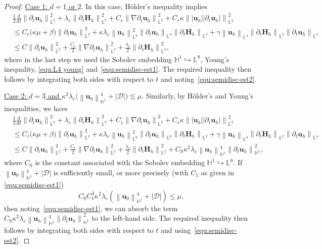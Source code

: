 \documentclass[11pt, reqno]{amsart}
\theoremstyle{definition}
\theoremstyle{remark}
\numberwithin{equation}{section}
\newcommand{\bff}{\boldsymbol}
\newcommand{\bb}{\mathbb}
\newcommand{\ddt}{\frac{\mathrm{d}}{\mathrm{d}t}}
\newcommand{\norm}[2]{\left\|{#1}\right\|_{#2}}
\begin{document}
\begin{proof}
\medskip
\noindent
\underline{Case 1: $d=1$ or $2$}. In this case, H\"{o}lder's inequality implies
\begin{align*}
	&\frac{1}{2} \ddt \norm{\partial_t \bff{u}_h}{\bb{L}^2}^2
	+
	\lambda_e \norm{\partial_t \bff{H}_h}{\bb{L}^2}^2
	+
	C_r \norm{\nabla \partial_t \bff{u}_h}{\bb{L}^2}^2
	+
	C_r\kappa \norm{|\bff{u}_h| |\partial_t \bff{u}_h|}{\bb{L}^2}^2
	\\
	&\leq
	C_r \big(\kappa\mu+\beta\big) \norm{\partial_t \bff{u}_h}{\bb{L}^2}^2
	+
	\kappa \lambda_e \norm{\bff{u}_h}{\bb{L}^8}^2
	\norm{\partial_t \bff{u}_h}{\bb{L}^4}
	\norm{\partial_t \bff{H}_h}{\bb{L}^2}
	+
	\gamma \norm{\bff{u}_h}{\bb{L}^4}
	\norm{\partial_t \bff{H}_h}{\bb{L}^2}
	\norm{\partial_t \bff{u}_h}{\bb{L}^4}
	\\
	&\leq
	C \norm{\partial_t \bff{u}_h}{\bb{L}^2}^2
	+
	\frac{C_r}{2} \norm{\nabla \partial_t \bff{u}_h}{\bb{L}^2}^2
	+
	\frac{\lambda_e}{2} \norm{\partial_t \bff{H}_h}{\bb{L}^2}^2,
\end{align*}
where in the last step we used the Sobolev embedding $\bb{H}^1 \hookrightarrow \bb{L}^8$, Young's inequality, \eqref{equ:L4 young} and~\eqref{equ:semidisc-est1}. The required inequality then follows by integrating both sides with respect to $t$ and noting~\eqref{equ:semidisc-est2}.

\medskip
\noindent
\underline{Case 2: $d=3$ and $\kappa^2 \lambda_e \big(\norm{\bff{u}_0}{\bb{H}^1}^4 + |\mathscr{D}|\big)\lesssim \mu$}. Similarly, by H\"{o}lder's and Young's inequalities, we have
\begin{align*}
	&\frac{1}{2} \ddt \norm{\partial_t \bff{u}_h}{\bb{L}^2}^2
	+
	\lambda_e \norm{\partial_t \bff{H}_h}{\bb{L}^2}^2
	+
	C_r \norm{\nabla \partial_t \bff{u}_h}{\bb{L}^2}^2
	+
	C_r\kappa \norm{|\bff{u}_h| |\partial_t \bff{u}_h|}{\bb{L}^2}^2
	\\
	&\leq
	C_r \big(\kappa\mu+\beta\big) \norm{\partial_t \bff{u}_h}{\bb{L}^2}^2
	+
	\kappa \lambda_e \norm{\bff{u}_h}{\bb{L}^6}^2
	\norm{\partial_t \bff{u}_h}{\bb{L}^6}
	\norm{\partial_t \bff{H}_h}{\bb{L}^2}
	+
	\gamma \norm{\bff{u}_h}{\bb{L}^4}
	\norm{\partial_t \bff{H}_h}{\bb{L}^2}
	\norm{\partial_t \bff{u}_h}{\bb{L}^4}
	\\
	&\leq
	C \norm{\partial_t \bff{u}_h}{\bb{L}^2}^2
	+
	\frac{C_r}{2} \norm{\nabla \partial_t \bff{u}_h}{\bb{L}^2}^2
	+
	\frac{\lambda_e}{2} \norm{\partial_t \bff{H}_h}{\bb{L}^2}^2
	+
	C_{\mathrm{S}} \kappa^2 \lambda_e \norm{\bff{u}_h}{\bb{H}^1}^4 \norm{\partial_t \bff{u}_h}{\bb{H}^1}^2,
\end{align*}
where $C_{\mathrm{S}}$ is the constant associated with the Sobolev embedding $\bb{H}^1\hookrightarrow \bb{L}^6$.
If $\norm{\bff{u}_0}{\bb{H}^1}^4 + |\mathscr{D}|$ is sufficiently small, or more precisely (with $C_1$ as given in \eqref{equ:semidisc-est1})
\[
C_{\mathrm{S}} C_1^4 \kappa^2 \lambda_e \left(\norm{\bff{u}_0}{\bb{H}^1}^4 + |\mathscr{D}|\right)\leq \mu,
\]
then noting~\eqref{equ:semidisc-est1}, we can absorb the term~$C_{\mathrm{S}} \kappa^2 \lambda_e \norm{\bff{u}_h}{\bb{H}^1}^4 \norm{\partial_t \bff{u}_h}{\bb{H}^1}^2$ to the left-hand side. The required inequality then follows by integrating both sides with respect to $t$ and using~\eqref{equ:semidisc-est2}.


\end{proof}
\end{document}
